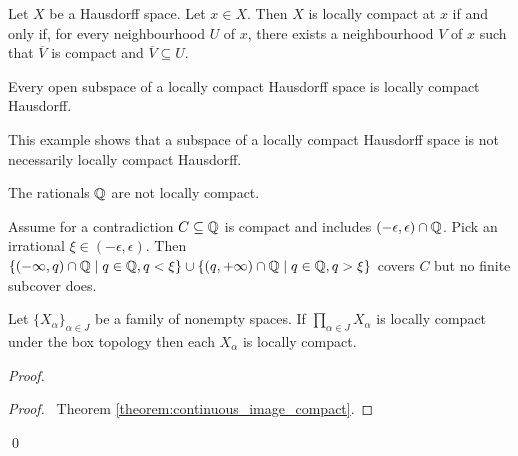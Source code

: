 \begin{proposition}
    \label{proposition:locally_compact_neighbourhood}
    Let $X$ be a Hausdorff space. Let $x \in X$. Then $X$ is locally compact at $x$ if and only if,
    for every neighbourhood $U$ of $x$, there exists a neighbourhood $V$ of $x$ such that
    $\overline{V}$ is compact and $\overline{V} \subseteq U$.
\end{proposition}

\begin{corollary}
    Every open subspace of a locally compact Hausdorff space is locally compact Hausdorff.
\end{corollary}

This example shows that a subspace of a locally compact Hausdorff space is not necessarily locally
compact Hausdorff.

\begin{example}
    The rationals $\mathbb{Q}$ are not locally compact.

    Assume for a contradiction $C \subseteq \mathbb{Q}$ is compact and includes $(-\epsilon, \epsilon)
    \cap \mathbb{Q}$. Pick an irrational $\xi \in (- \epsilon, \epsilon)$. Then $\{ (-\infty, q) \cap
    \mathbb{Q} \mid q \in \mathbb{Q}, q < \xi \} \cup \{ (q, +\infty) \cap
    \mathbb{Q} \mid q \in \mathbb{Q}, q > \xi \}$ covers $C$ but no finite subcover does.
\end{example}

\begin{proposition}
    Let $\{ X_\alpha \}_{\alpha \in J}$ be a family of nonempty spaces. If
    $\prod_{\alpha \in J} X_\alpha$ is locally compact under the box topology then each $X_\alpha$ is
    locally compact.
\end{proposition}

\begin{proof}
    \pf
    \begin{proof}
        \pf\ Theorem \ref{theorem:continuous_image_compact}.
    \end{proof}
    \qed
\end{proof}

